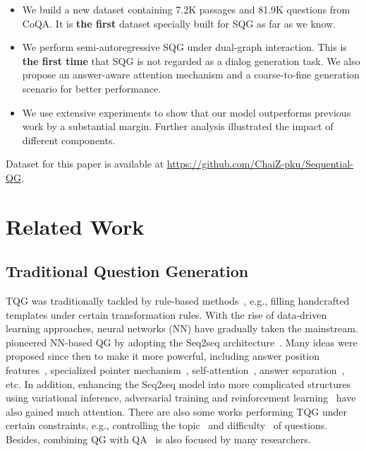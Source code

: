 \documentclass[11pt,a4paper]{article}
\begin{document}
\begin{itemize}
	\item We build a new dataset containing 7.2K passages and 81.9K questions from CoQA. It is \textbf{the first} dataset specially built for SQG as far as we know.
	\item We perform semi-autoregressive SQG under dual-graph interaction. This is \textbf{the first time} that SQG is not regarded as a dialog generation task. We also propose an answer-aware attention mechanism and a coarse-to-fine generation scenario for better performance.
	\item We use extensive experiments to show that our model outperforms previous work by a substantial margin. Further analysis illustrated the impact of different components.
\end{itemize}

Dataset for this paper is available at \url{https://github.com/ChaiZ-pku/Sequential-QG}.

\section{Related Work}
\subsection{Traditional Question Generation}
TQG was traditionally tackled by rule-based methods~\cite{lindberg2013generating, mazidi2014linguistic, hussein2014automatic, labutov2015deep}, e.g., filling handcrafted templates under certain transformation rules. 
With the rise of data-driven learning approaches, neural networks (NN) have gradually taken the mainstream. \citet{du2017learning} pioneered NN-based QG by adopting the Seq2seq architecture~\cite{sutskever2014sequence}. 
Many ideas were proposed since then to make it more powerful, including answer position features~\cite{zhou2017neural}, specialized pointer mechanism~\cite{zhao2018paragraph}, self-attention~\cite{scialom2019self}, answer separation~\cite{kim2019improving}, etc. In addition, enhancing the Seq2seq model into more complicated structures using variational inference, adversarial training and reinforcement learning~\cite{yao2018teaching, kumar2019putting} have also gained much attention.
There are also some works performing TQG under certain constraints, e.g., controlling the topic~\cite{hu2018aspect} and difficulty~\cite{gao2018difficulty} of questions.
Besides, combining QG with QA~\cite{wang2017joint, tang2017question, sun2019joint} is also focused by many researchers.
\end{document}
